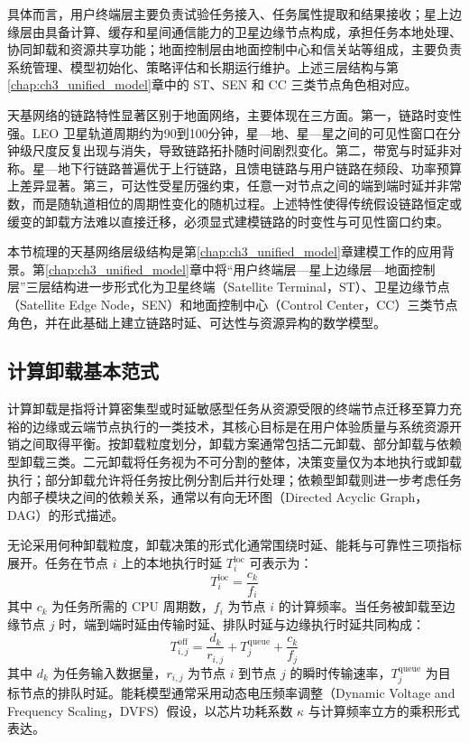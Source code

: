 具体而言，用户终端层主要负责试验任务接入、任务属性提取和结果接收；星上边缘层由具备计算、缓存和星间通信能力的卫星边缘节点构成，承担任务本地处理、协同卸载和资源共享功能；地面控制层由地面控制中心和信关站等组成，主要负责系统管理、模型初始化、策略评估和长期运行维护。上述三层结构与第\ref{chap:ch3_unified_model}章中的 ST、SEN 和 CC 三类节点角色相对应。

天基网络的链路特性显著区别于地面网络，主要体现在三方面。第一，链路时变性强。LEO 卫星轨道周期约为90到100分钟，星—地、星—星之间的可见性窗口在分钟级尺度反复出现与消失，导致链路拓扑随时间剧烈变化\cite{Sun2024MCO}。第二，带宽与时延非对称。星—地下行链路普遍优于上行链路，且馈电链路与用户链路在频段、功率预算上差异显著\cite{Wang2024NTN}。第三，可达性受星历强约束，任意一对节点之间的端到端时延并非常数，而是随轨道相位的周期性变化的随机过程。上述特性使得传统假设链路恒定或缓变的卸载方法难以直接迁移，必须显式建模链路的时变性与可见性窗口约束。

本节梳理的天基网络层级结构是第\ref{chap:ch3_unified_model}章建模工作的应用背景。第\ref{chap:ch3_unified_model}章中将“用户终端层—星上边缘层—地面控制层”三层结构进一步形式化为卫星终端（Satellite Terminal，ST）、卫星边缘节点（Satellite Edge Node，SEN）和地面控制中心（Control Center，CC）三类节点角色，并在此基础上建立链路时延、可达性与资源异构的数学模型。

\subsection{计算卸载基本范式}
\label{subsec:ch2_offloading_paradigm}

计算卸载是指将计算密集型或时延敏感型任务从资源受限的终端节点迁移至算力充裕的边缘或云端节点执行的一类技术，其核心目标是在用户体验质量与系统资源开销之间取得平衡\cite{ref2,Tang2022DRL,Adu2026MADRL}。按卸载粒度划分，卸载方案通常包括二元卸载、部分卸载与依赖型卸载三类。二元卸载将任务视为不可分割的整体，决策变量仅为本地执行或卸载执行；部分卸载允许将任务按比例分割后并行处理；依赖型卸载则进一步考虑任务内部子模块之间的依赖关系，通常以有向无环图（Directed Acyclic Graph，DAG）的形式描述\cite{Guo2024E2E,Qu2024E2E}。

无论采用何种卸载粒度，卸载决策的形式化通常围绕时延、能耗与可靠性三项指标展开。任务在节点 $i$ 上的本地执行时延 $T^{\mathrm{loc}}_i$ 可表示为：
\begin{equation}
  T^{\mathrm{loc}}_i = \frac{c_k}{f_i}
  \label{eq:ch2_local_delay}
\end{equation}
其中 $c_k$ 为任务所需的 CPU 周期数，$f_i$ 为节点 $i$ 的计算频率。当任务被卸载至边缘节点 $j$ 时，端到端时延由传输时延、排队时延与边缘执行时延共同构成：
\begin{equation}
  T^{\mathrm{off}}_{i,j} = \frac{d_k}{r_{i,j}} + T^{\mathrm{queue}}_j + \frac{c_k}{f_j}
  \label{eq:ch2_offload_delay}
\end{equation}
其中 $d_k$ 为任务输入数据量，$r_{i,j}$ 为节点 $i$ 到节点 $j$ 的瞬时传输速率，$T^{\mathrm{queue}}_j$ 为目标节点的排队时延。能耗模型通常采用动态电压频率调整（Dynamic Voltage and Frequency Scaling，DVFS）假设，以芯片功耗系数 $\kappa$ 与计算频率立方的乘积形式表达\cite{Sun2024MCO}。

